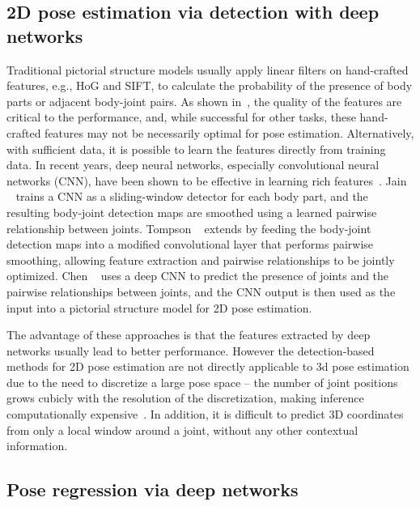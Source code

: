 \documentclass[10pt,twocolumn,letterpaper]{article}
\begin{document}
\subsection{2D pose estimation via detection with deep networks}
%
%
Traditional pictorial structure models usually apply linear filters on hand-crafted features, e.g., HoG and SIFT, to calculate the probability of the presence of body parts or adjacent body-joint pairs.
As shown in~\cite{Eichner2009BMVC}, the quality of the features are critical to the performance, and, while successful for other tasks, these hand-crafted features may not be necessarily optimal for pose estimation.
% 
%
Alternatively, with sufficient data, it is %
possible to learn the features directly from training data.
In recent years, deep neural networks, especially convolutional neural networks (CNN), have been shown to be effective in learning rich features~\cite{Ali2014, Alex2012}.
%
%
Jain \etal~\cite{arjun2014iclr} trains a CNN as a sliding-window detector for each body part, 
and the resulting body-joint detection maps are smoothed using a learned pairwise relationship between joints.
%
%
%
%
%
Tompson \etal~\cite{Jonathan2014} extends \cite{arjun2014iclr} by feeding the body-joint detection maps into a modified convolutional layer that performs pairwise smoothing, allowing  feature extraction and pairwise relationships to be jointly optimized.
%
%
%
Chen \etal~\cite{Chen_NIPS14}  uses a deep CNN to predict the presence of joints and the pairwise relationships between joints, and the CNN output is then used as the input into a pictorial structure model for 2D pose estimation.
%
%
%
%

%
%
The advantage of these approaches is that the features extracted by deep networks usually lead to better performance.
%
%
%
%
However the detection-based methods for 2D pose estimation are not directly applicable to 3d pose estimation %
due to the need to discretize a large pose space -- the number of joint positions grows cubicly with the resolution of the discretization, making inference computationally expensive~\cite{Burenius2013}.
%
%
In addition, it is difficult to predict 3D coordinates from only a local window around a joint, without any other contextual information.
%


 

\subsection{Pose regression via deep networks}
\end{document}

